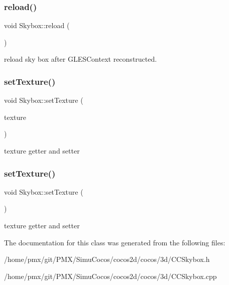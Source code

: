 \subsubsection{\texorpdfstring{reload()}{reload()}\hspace{0.1cm}{\footnotesize\ttfamily [2/2]}}
{\footnotesize\ttfamily void Skybox\+::reload (\begin{DoxyParamCaption}{ }\end{DoxyParamCaption})}

reload sky box after G\+L\+E\+S\+Context reconstructed. \mbox{\label{classSkybox_a60f515eb4326c4f077817992396147f8}} 
\subsubsection{\texorpdfstring{set\+Texture()}{setTexture()}\hspace{0.1cm}{\footnotesize\ttfamily [1/2]}}
{\footnotesize\ttfamily void Skybox\+::set\+Texture (\begin{DoxyParamCaption}\item[{\hyperlink{classTextureCube}{Texture\+Cube} $\ast$}]{texture }\end{DoxyParamCaption})}

texture getter and setter \mbox{\label{classSkybox_a60f515eb4326c4f077817992396147f8}} 
\subsubsection{\texorpdfstring{set\+Texture()}{setTexture()}\hspace{0.1cm}{\footnotesize\ttfamily [2/2]}}
{\footnotesize\ttfamily void Skybox\+::set\+Texture (\begin{DoxyParamCaption}\item[{\hyperlink{classTextureCube}{Texture\+Cube} $\ast$}]{ }\end{DoxyParamCaption})}

texture getter and setter 

The documentation for this class was generated from the following files\+:\begin{DoxyCompactItemize}
\item 
/home/pmx/git/\+P\+M\+X/\+Simu\+Cocos/cocos2d/cocos/3d/C\+C\+Skybox.\+h\item 
/home/pmx/git/\+P\+M\+X/\+Simu\+Cocos/cocos2d/cocos/3d/C\+C\+Skybox.\+cpp\end{DoxyCompactItemize}
